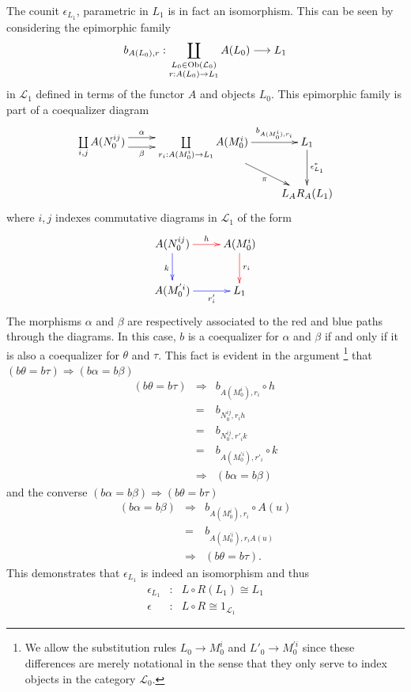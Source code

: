 \documentclass[aps,twocolumn]{revtex4-1}
\begin{document}
The counit $\epsilon_{L_1}$, parametric in $L_1$ is in fact an isomorphism. This can be seen by considering the epimorphic family
$$
b_{A(L_0),r} : \coprod\limits_{\substack{L_0 \in \mathop{\rm Ob}\nolimits(\mathcal{L}_0) \\ r:A(L_0) \rightarrow L_1}}
A(L_0) \longrightarrow L_1
$$
in $\mathcal{L}_1$ defined in terms of the functor $A$ and objects $L_0$. This epimorphic family is part of a coequalizer diagram
\begin{displaymath}
\xymatrix{
\coprod\limits_{\substack{i,j}}
A(N_0^{ij})
\ar@<1ex>[r]^-{\alpha} \ar@<-1ex>[r]_-{\beta}
&
\coprod\limits_{\substack{r_i:A(M_0^i) \rightarrow L_1}}
A(M_0^i)
\ar[r]^-{b_{A(M_0^i),r_i}} \ar[dr]_-{\pi}
&
L_1 \ar[d]^-{\epsilon_{L_1}^*}\\
& & L_A R_A(L_1)
}
\end{displaymath}
where $i,j$ indexes commutative diagrams in $\mathcal{L}_1$ of the form
\begin{displaymath}
\xymatrix{
A(N_0^{ij}) \ar@[red][r]^-{h} \ar@[blue][d]_{k} & A(M_0^i) \ar@[red][d]^{r_i} \\
A(M_0^{'i}) \ar@[blue][r]_-{r'_i} & L_1
}
\end{displaymath}
The morphisms $\alpha$ and $\beta$ are respectively associated to the red and blue paths through the diagrams. In this case, $b$ is a coequalizer for $\alpha$ and $\beta$ if and only if it is also a coequalizer for $\theta$ and $\tau$. This fact is evident in the argument \footnote{We allow the substitution rules $L_0 \rightarrow M_0^i$ and $L'_0 \rightarrow M_0^{'i}$ since these differences are merely notational in the sense that they only serve to index objects in the category $\mathcal{L}_0$.} that $(b \theta = b \tau) \Rightarrow (b \alpha = b \beta)$
\begin{eqnarray*}
(b \theta = b \tau) &\Rightarrow & b_{A(M_0^i),r_i} \circ h \\
&=& b_{N_0^{ij},r_i h}\\
&=& b_{N_0^{ij},r'_i k}\\
&=& b_{A(M_0^{'i}),r'_i} \circ k\\
&\Rightarrow & (b \alpha = b \beta)
\end{eqnarray*}
and the converse $(b \alpha = b \beta) \Rightarrow (b \theta = b \tau)$
\begin{eqnarray*}
(b \alpha = b \beta) &\Rightarrow & b_{A(M_0^i),r_i} \circ A(u) \\
&=& b_{A(M_0^{'i}),r_i A(u)}\\
&\Rightarrow & (b \theta = b \tau).
\end{eqnarray*}
This demonstrates that $\epsilon_{L_1}$ is indeed an isomorphism and thus
\begin{eqnarray*}
\epsilon_{L_1} &:& L \circ R(L_1) \cong L_1\\
\epsilon &:& L \circ R \cong 1_{\mathcal{L}_1}
\end{eqnarray*}
\end{document}
